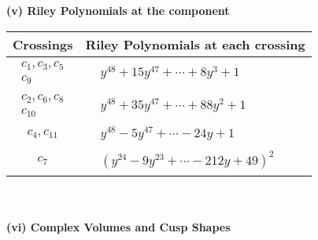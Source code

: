 \documentclass[1p]{elsarticle_modified}
\theoremstyle{definition}
\begin{document}
\newpage\renewcommand{\arraystretch}{1}
\flushleft \textbf{(v) Riley Polynomials at the component}\newline \\
\begin{tabular}{m{50pt}|m{274pt}}
Crossings & \hspace{64pt}Riley Polynomials at each crossing \\
\hline $$\begin{aligned}c_{1},c_{3},c_{5}\\c_{9}\end{aligned}$$&$\begin{aligned}
&y^{48}+15 y^{47}+\cdots+8 y^3+1
\end{aligned}$\\
\hline $$\begin{aligned}c_{2},c_{6},c_{8}\\c_{10}\end{aligned}$$&$\begin{aligned}
&y^{48}+35 y^{47}+\cdots+88 y^2+1
\end{aligned}$\\
\hline $$\begin{aligned}c_{4},c_{11}\end{aligned}$$&$\begin{aligned}
&y^{48}-5 y^{47}+\cdots-24 y+1
\end{aligned}$\\
\hline $$\begin{aligned}c_{7}\end{aligned}$$&$\begin{aligned}
&(y^{24}-9 y^{23}+\cdots-212 y+49)^{2}
\end{aligned}$\\
\hline
\end{tabular}\\~\\
\newpage\flushleft \textbf{(vi) Complex Volumes and Cusp Shapes}
\end{document}
